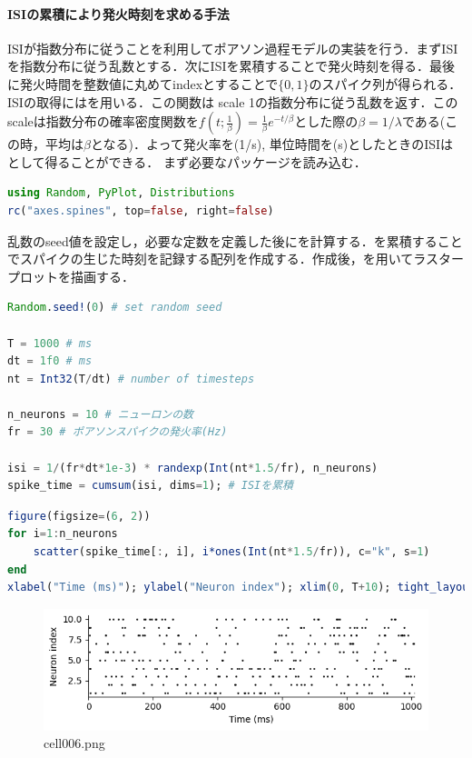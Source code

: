 \paragraph{ISIの累積により発火時刻を求める手法}
ISIが指数分布に従うことを利用してポアソン過程モデルの実装を行う．まずISIを指数分布に従う乱数とする．次にISIを累積することで発火時刻を得る．最後に発火時間を整数値に丸めてindexとすることで$\{0, 1\}$のスパイク列が得られる．ISIの取得にはを用いる．この関数は scale 1の指数分布に従う乱数を返す．このscaleは指数分布の確率密度関数を$f(t; \frac{1}{\beta}) = \frac{1}{\beta} e^{-t/\beta}$とした際の$\beta = 1/\lambda$である(この時，平均は$\beta$となる)．よって発火率を(1/s), 単位時間を(s)としたときのISIは として得ることができる．
まず必要なパッケージを読み込む．
\begin{lstlisting}[language=julia]
using Random, PyPlot, Distributions
rc("axes.spines", top=false, right=false)
\end{lstlisting}
乱数のseed値を設定し，必要な定数を定義した後にを計算する．を累積することでスパイクの生じた時刻を記録する配列を作成する．作成後，を用いてラスタープロットを描画する．
\begin{lstlisting}[language=julia]
Random.seed!(0) # set random seed

T = 1000 # ms
dt = 1f0 # ms
nt = Int32(T/dt) # number of timesteps

n_neurons = 10 # ニューロンの数
fr = 30 # ポアソンスパイクの発火率(Hz)

isi = 1/(fr*dt*1e-3) * randexp(Int(nt*1.5/fr), n_neurons)
spike_time = cumsum(isi, dims=1); # ISIを累積
\end{lstlisting}
\begin{lstlisting}[language=julia]
figure(figsize=(6, 2))
for i=1:n_neurons
    scatter(spike_time[:, i], i*ones(Int(nt*1.5/fr)), c="k", s=1)
end
xlabel("Time (ms)"); ylabel("Neuron index"); xlim(0, T+10); tight_layout()
\end{lstlisting}
\begin{figure}[ht]
	\centering
	\includegraphics[scale=0.8, max width=\linewidth]{./fig/neuron-model/isi/cell006.png}
	\caption{cell006.png}
	\label{cell006.png}
\end{figure}
